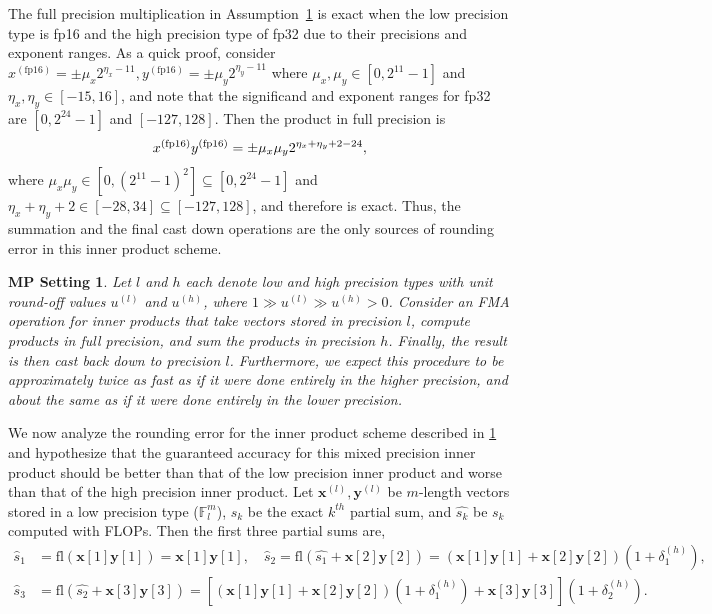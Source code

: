 \documentclass[review,onefignum,onetabnum]{siamart190516}
\newtheorem{assump}[theorem]{MP Setting}
\newcommand{\F}{\mathbb{F}}
\newcommand{\dd}{\delta}
\newcommand{\bb}[1]{\mathbf{#1}}
\newcommand{\fl}{\mathrm{fl}}
\begin{document}
The full precision multiplication in Assumption~\ref{assump:mp} is exact when the low precision type is fp16 and the high precision type of fp32 due to their precisions and exponent ranges. 
As a quick proof, consider $x^{(\text{fp16})} = \pm\mu_x2^{\eta_x -11},y^{(\text{fp16})} = \pm\mu_y2^{\eta_y -11}$ where $\mu_x,\mu_y\in[0,2^{11}-1]$ and $\eta_x,\eta_y\in[-15,16]$, and note that the significand and exponent ranges for fp32 are $[0, 2^{24}-1]$ and $[-127,128]$.
Then the product in full precision is
\[\footnotesize x^{(\text{fp16})}y^{(\text{fp16})} = \pm\mu_x\mu_y 2^{\eta_x+\eta_y+2-24},\]
where  $\mu_x\mu_y \in[0,(2^{11}-1)^2] \subseteq [0,2^{24}-1]$ and $\eta_x+\eta_y +2\in[-28,34]\subseteq[-127,128]$, and therefore is exact.
Thus, the summation and the final cast down operations are the only sources of rounding error in this inner product scheme.
\begin{assump}
	\label{assump:mp}
	Let $l$ and $h$ each denote low and high precision types with unit round-off values $u^{(l)}$ and $u^{(h)}$, where $1 \gg u^{(l)} \gg u^{(h)} >0$.
	Consider an FMA operation for inner products that take vectors stored in precision $l$, compute products in full precision, and sum the products in precision $h$. 
	Finally, the result is then cast back down to precision $l$.
	Furthermore, we expect this procedure to be approximately twice as fast as if it were done entirely in the higher precision, and about the same as if it were done entirely in the lower precision. 
\end{assump}
We now analyze the rounding error for the inner product scheme described in \cref{assump:mp} and hypothesize that the guaranteed accuracy for this mixed precision inner product should be better than that of the low precision inner product and worse than that of the high precision inner product.
Let $\bb{x}^{(l)},\bb{y}^{(l)}$ be $m$-length vectors stored in a low precision type ($\F_l^m$), $s_k$ be the exact $k^{th}$ partial sum, and $\hat{s_k}$ be $s_k$ computed with FLOPs.
Then the first three partial sums are,
\begin{align*}
\hat{s}_1 &= \fl (\bb{x}[1]\bb{y}[1]) = \bb{x}[1]\bb{y}[1],\quad \hat{s}_2 = \fl(\hat{s_1} + \bb{x}[2]\bb{y}[2]) = \left(\bb{x}[1]\bb{y}[1]+ \bb{x}[2]\bb{y}[2]\right)(1+\dd_{1}^{(h)}),\\
\hat{s}_3 &= \fl(\hat{s_2}+\bb{x}[3]\bb{y}[3]) = \left[\left(\bb{x}[1]\bb{y}[1] + \bb{x}[2]\bb{y}[2]\right)(1+\dd_{1}^{(h)})  + \bb{x}[3]\bb{y}[3]\right](1+\dd_{2}^{(h)}).
\end{align*}
\end{document}
